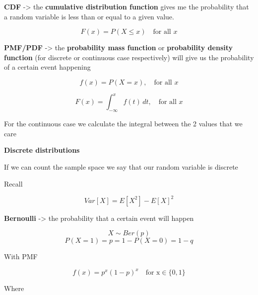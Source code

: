 \vspace{10pt}

\textbf{CDF} -> the \textbf{cumulative distribution function} gives me the probability that a random variable is less than or equal to a given value. 

\begin{equation}
    F(x) = P(X \le x) \quad \text{for all } x
\end{equation}


\textbf{PMF/PDF} -> the \textbf{probability mass function} or \textbf{probability density function} (for discrete or continuous case respectively) will give us the probability of a certain event happening

\begin{equation}
    f(x) = P(X = x), \quad \text{for all } x
\end{equation}

\begin{equation}
F(x) = \int_{-\infty}^{x} f(t)\,dt, \quad \text{for all } x
\end{equation}

For the continuous case we calculate the integral between the 2 values that we care 

\vspace{10pt}

\textbf{Discrete distributions}

If we can count the sample space we say that our random variable is discrete

Recall

\begin{equation}
    Var[X] = E[X^2] - E[X]^2
\end{equation}

\vspace{20pt}

\textbf{Bernoulli} -> the probability that a certain event will happen

\begin{equation}
    X \sim Ber(p)
\end{equation}
\begin{equation}
    P(X=1) = p = 1 -P(X=0) = 1-q
\end{equation}

With PMF

\begin{equation}
    f(x) = p^x(1-p)^x \quad \text{for x} \in \{0, 1\}
\end{equation}

Where

